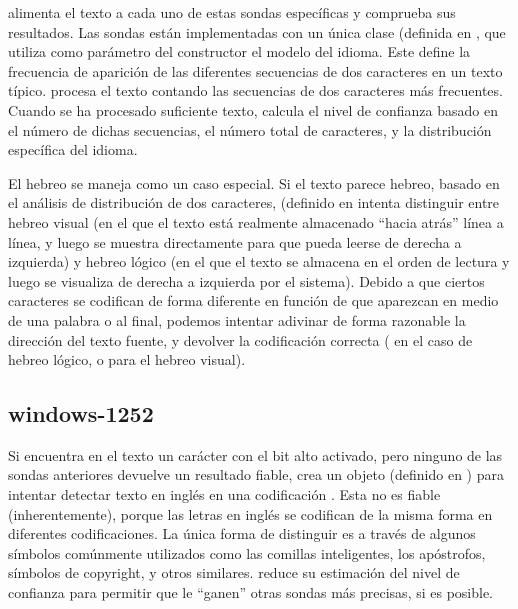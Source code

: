  alimenta el texto a cada uno de estas sondas específicas y comprueba sus resultados. Las sondas están implementadas con un única clase  (definida en , que utiliza como parámetro del constructor el modelo del idioma. Este define la frecuencia de aparición de las diferentes secuencias de dos caracteres en un texto típico.  procesa el texto contando las secuencias de dos caracteres más frecuentes. Cuando se ha procesado suficiente texto, calcula el nivel de confianza basado en el número de dichas secuencias, el número total de caracteres, y la distribución específica del idioma.

El hebreo se maneja como un caso especial. Si el texto parece hebreo, basado en el análisis de distribución de dos caracteres,  (definido en  intenta distinguir entre hebreo visual (en el que el texto está realmente almacenado ``hacia atrás'' línea a línea, y luego se muestra directamente para que pueda leerse de derecha a izquierda) y hebreo lógico (en el que el texto se almacena en el orden de lectura y luego se visualiza de derecha a izquierda por el sistema). Debido a que ciertos caracteres se codifican de forma diferente en función de que aparezcan en medio de una palabra o al final, podemos intentar adivinar de forma razonable la dirección del texto fuente, y devolver la codificación correcta ( en el caso de hebreo lógico, o  para el hebreo visual).

\subsection{windows-1252}

Si  encuentra en el texto un carácter con el bit alto activado, pero ninguno de las sondas anteriores devuelve un resultado fiable, crea un objeto  (definido en ) para intentar detectar texto en inglés en una codificación . Esta no es fiable (inherentemente), porque las letras en inglés se codifican de la misma forma en diferentes codificaciones. La única forma de distinguir  es a través de algunos símbolos comúnmente utilizados como las comillas inteligentes, los apóstrofos, símbolos de copyright, y otros similares.  reduce su estimación del nivel de confianza para permitir que le ``ganen'' otras sondas más precisas, si es posible.

